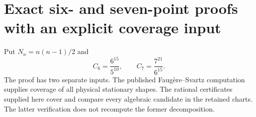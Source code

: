 \section{Exact six- and seven-point proofs with an explicit coverage input}
\label{sec:six-seven-improved-proof}

Put $N_n=n(n-1)/2$ and
\[
 C_6=\frac{6^{15}}{5^{10}},\qquad
 C_7=\frac{7^{21}}{6^{15}}.
\]
The proof has two separate inputs. The published Faug\`ere--Svartz
computation supplies coverage of all physical stationary shapes.
The rational certificates supplied here cover and compare every algebraic
candidate in the retained charts. The latter verification does not
recompute the former decomposition.

